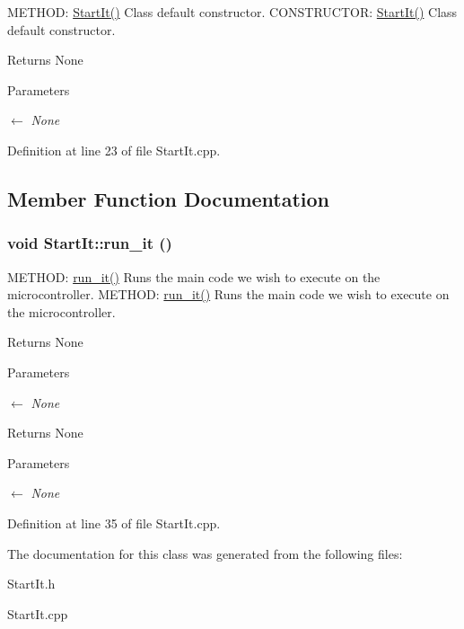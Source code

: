 METHOD: \hyperlink{classStartIt_a328e7558712e4870d567c3c4507f12d5_a328e7558712e4870d567c3c4507f12d5}{StartIt()} Class default constructor. CONSTRUCTOR: \hyperlink{classStartIt_a328e7558712e4870d567c3c4507f12d5_a328e7558712e4870d567c3c4507f12d5}{StartIt()} Class default constructor.

\begin{DoxyReturn}{Returns}
None 
\end{DoxyReturn}

\begin{DoxyParams}{Parameters}
\item[\mbox{$\leftarrow$} {\em None}]\end{DoxyParams}


Definition at line 23 of file StartIt.cpp.

\subsection{Member Function Documentation}
\hypertarget{classStartIt_a8a1a2a8f7b8f05e248baa8958bb93967_a8a1a2a8f7b8f05e248baa8958bb93967}{
\subsubsection[{run\_\-it}]{\setlength{\rightskip}{0pt plus 5cm}void StartIt::run\_\-it ()}}
\label{classStartIt_a8a1a2a8f7b8f05e248baa8958bb93967_a8a1a2a8f7b8f05e248baa8958bb93967}


METHOD: \hyperlink{classStartIt_a8a1a2a8f7b8f05e248baa8958bb93967_a8a1a2a8f7b8f05e248baa8958bb93967}{run\_\-it()} Runs the main code we wish to execute on the microcontroller. METHOD: \hyperlink{classStartIt_a8a1a2a8f7b8f05e248baa8958bb93967_a8a1a2a8f7b8f05e248baa8958bb93967}{run\_\-it()} Runs the main code we wish to execute on the microcontroller.

\begin{DoxyReturn}{Returns}
None 
\end{DoxyReturn}

\begin{DoxyParams}{Parameters}
\item[\mbox{$\leftarrow$} {\em None}]\end{DoxyParams}
\begin{DoxyReturn}{Returns}
None 
\end{DoxyReturn}

\begin{DoxyParams}{Parameters}
\item[\mbox{$\leftarrow$} {\em None}]\end{DoxyParams}


Definition at line 35 of file StartIt.cpp.

The documentation for this class was generated from the following files:\begin{DoxyCompactItemize}
\item 
StartIt.h\item 
StartIt.cpp\end{DoxyCompactItemize}
